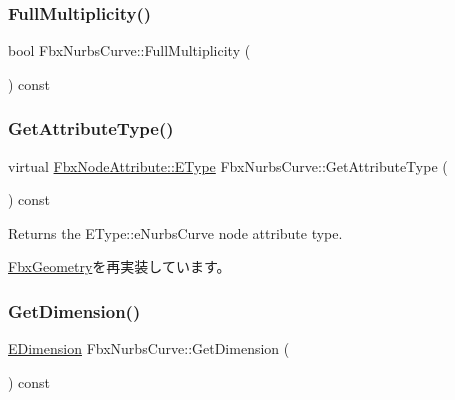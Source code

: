 \subsubsection{\texorpdfstring{Full\+Multiplicity()}{FullMultiplicity()}}
{\footnotesize\ttfamily bool Fbx\+Nurbs\+Curve\+::\+Full\+Multiplicity (\begin{DoxyParamCaption}{ }\end{DoxyParamCaption}) const}

\mbox{\label{class_fbx_nurbs_curve_aa6ec087af306c42ac814d43ea80c60b3}} 
\subsubsection{\texorpdfstring{Get\+Attribute\+Type()}{GetAttributeType()}}
{\footnotesize\ttfamily virtual \hyperlink{class_fbx_node_attribute_a08e1669d3d1a696910756ab17de56d6a}{Fbx\+Node\+Attribute\+::\+E\+Type} Fbx\+Nurbs\+Curve\+::\+Get\+Attribute\+Type (\begin{DoxyParamCaption}{ }\end{DoxyParamCaption}) const\hspace{0.3cm}{\ttfamily [virtual]}}



Returns the E\+Type\+::e\+Nurbs\+Curve node attribute type. 



\hyperlink{class_fbx_geometry_a41ae23e5d0cf08693bca49737f333de9}{Fbx\+Geometry}を再実装しています。

\mbox{\label{class_fbx_nurbs_curve_a3f08d738ff4b1ca4a521fa4be2359990}} 
\subsubsection{\texorpdfstring{Get\+Dimension()}{GetDimension()}}
{\footnotesize\ttfamily \hyperlink{class_fbx_nurbs_curve_a95d4a63cff6dd62901ea39c268336122}{E\+Dimension} Fbx\+Nurbs\+Curve\+::\+Get\+Dimension (\begin{DoxyParamCaption}{ }\end{DoxyParamCaption}) const}

